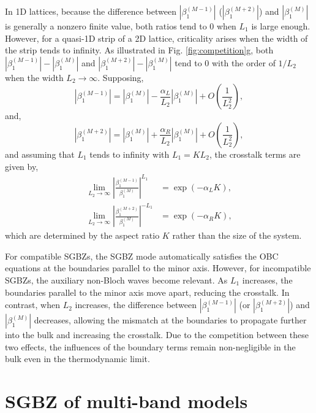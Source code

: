 \documentclass[pdflatex,sn-nature, iicol]{sn-jnl}%
\theoremstyle{thmstyleone}%
\theoremstyle{thmstyletwo}%
\theoremstyle{thmstylethree}%
\begin{document}
In 1D lattices, because the difference between $|\beta_{1}^{(M-1)}|$
($|\beta_{1}^{(M+2)}|$) and $|\beta_{1}^{(M)}|$ is generally a nonzero
finite value, both ratios tend to $0$ when $L_{1}$ is large enough.
However, for a quasi-1D strip of a 2D lattice, criticality arises
when the width of the strip tends to infinity. As illustrated in Fig.
\ref{fig:competition}g, both $|\beta_{1}^{(M-1)}|-|\beta_{1}^{(M)}|$
and $|\beta_{1}^{(M+2)}|-|\beta_{1}^{(M)}|$ tend to $0$ with the
order of $1/L_{2}$ when the width $L_{2}\rightarrow\infty$. Supposing,
\begin{equation}
|\beta_{1}^{(M-1)}|=|\beta_{1}^{(M)}|-\frac{\alpha_{L}}{L_{2}}|\beta_{1}^{(M)}|+O\left(\frac{1}{L_{2}^{2}}\right),
\end{equation}
and, 
\begin{equation}
|\beta_{1}^{(M+2)}|=|\beta_{1}^{(M)}|+\frac{\alpha_{R}}{L_{2}}|\beta_{1}^{(M)}|+O\left(\frac{1}{L_{2}^{2}}\right),
\end{equation}
and assuming that $L_{1}$ tends to infinity with $L_{1}=KL_{2}$,
the crosstalk terms are given by, 
\begin{align}
\lim_{L_{2}\rightarrow\infty}\left|\frac{\beta_{1}^{(M-1)}}{\beta_{1}^{(M)}}\right|^{L_{1}} & =\exp\left(-\alpha_{L}K\right),\label{eq:crosstalk-left}\\
\lim_{L_{2}\rightarrow\infty}\left|\frac{\beta_{1}^{(M+2)}}{\beta_{1}^{(M)}}\right|^{-L_{1}} & =\exp\left(-\alpha_{R}K\right),\label{eq:crosstalk-right}
\end{align}
which are determined by the aspect ratio $K$ rather than the size
of the system.

For compatible SGBZs, the SGBZ mode automatically satisfies the OBC
equations at the boundaries parallel to the minor axis. However, for
incompatible SGBZs, the auxiliary non-Bloch waves become relevant.
As $L_{1}$ increases, the boundaries parallel to the minor axis move
apart, reducing the crosstalk. In contrast, when $L_{2}$ increases,
the difference between $|\beta_{1}^{(M-1)}|$ (or $|\beta_{1}^{(M+2)}|$)
and $|\beta_{1}^{(M)}|$ decreases, allowing the mismatch at the boundaries
to propagate further into the bulk and increasing the crosstalk. Due
to the competition between these two effects, the influences of the
boundary terms remain non-negligible in the bulk even in the thermodynamic
limit.

\pagebreak
\section{SGBZ of multi-band models}
\end{document}
